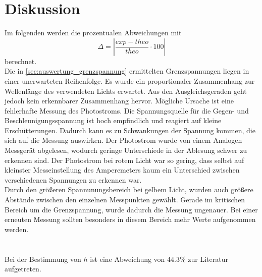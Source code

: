 \section{Diskussion}
\label{sec:Diskussion}

Im folgenden werden die prozentualen Abweichungen mit 
\begin{equation}\label{eq:1}
    \Delta = |\frac{exp - theo}{theo} \cdot 100|
\end{equation}
berechnet.
\\
Die in \autoref{sec:auswertung_grenzspannung} ermittelten Grenzspannungen liegen in einer unerwarteten Reihenfolge.
Es wurde ein proportionaler Zusammenhang zur Wellenlänge des verwendeten Lichts erwartet.
Aus den Ausgleichsgeraden geht jedoch kein erkennbarer Zusammenhang hervor. 
Mögliche Ursache ist eine fehlerhafte Messung des Photostroms. 
Die Spannungsquelle für die Gegen- und Beschleunigungsspannung ist hoch empfindlich und reagiert auf kleine Erschütterungen.
Dadurch kann es zu Schwankungen der Spannung kommen, die sich auf die Messung auswirken.
Der Photostrom wurde von einem Analogen Messgerät abgelesen, wodurch geringe Unterschiede in der Ablesung schwer zu erkennen sind.
Der Photostrom bei rotem Licht war so gering, dass selbst auf kleinster Messeinstellung des Amperemeters kaum ein Unterschied zwischen 
verschiedenen Spannungen zu erkennen war.\\
Durch den größeren Spannunungsbereich bei gelbem Licht, wurden auch größere Abstände zwischen den einzelnen Messpunkten gewählt.
Gerade im kritischen Bereich um die Grenzspannung, wurde dadurch die Messung ungenauer. 
Bei einer erneuten Messung sollten besonders in diesem Bereich mehr Werte aufgenommen werden.\\
\\
\\
Bei der Bestimmung von $h$ ist eine Abweichung von $44.3\%$ zur Literatur aufgetreten\cite{planck}.
